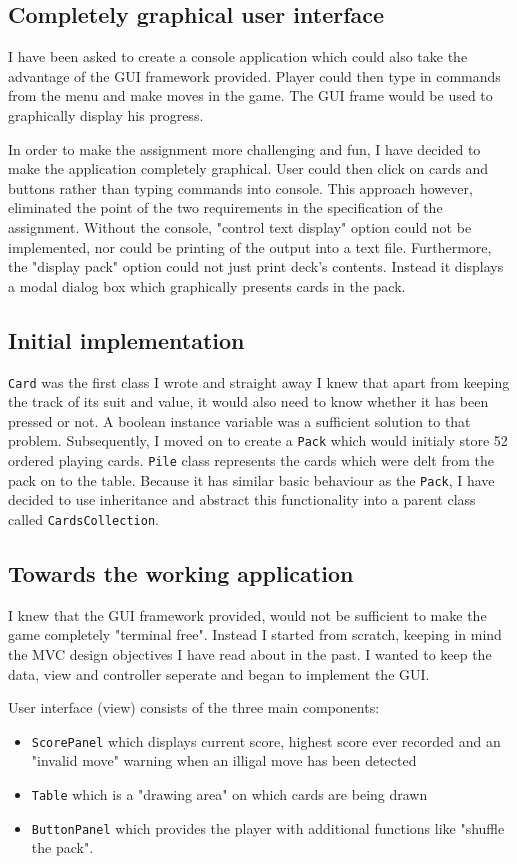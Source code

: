 \documentclass[a4paper, 11pt, titlepage]{article}
\begin{document}
\subsection{Completely graphical user interface}
I have been asked to create a console application which could also take the advantage of 
the GUI framework provided. Player could then type in commands from the menu and 
make moves in the game. The GUI frame would be used to graphically display his progress. 

In order to make the assignment more challenging and fun, I have decided to make the 
application completely graphical. User could then click on cards and buttons rather than
typing commands into console. This approach however, eliminated the point of the two 
requirements in the specification of the assignment. Without the console, "control text
display" option could not be implemented, nor could be printing of the output into a 
text file. Furthermore, the "display pack" option could not just print deck's contents.
Instead it displays a modal dialog box which graphically presents cards in the pack.

\subsection{Initial implementation}
\texttt{Card} was the first class I wrote and straight away I knew that apart from 
keeping the track of its suit and value, it would also need to know whether it has been
pressed or not. A boolean instance variable was a sufficient solution to that problem. 
Subsequently, I moved on to create a \texttt{Pack} which would initialy store 52 ordered
playing cards. \texttt{Pile} class represents the cards which were delt from the pack
on to the table. Because it has similar basic behaviour as the \texttt{Pack}, I have
decided to use inheritance and abstract this functionality into a parent class called
\texttt{CardsCollection}. 

\subsection{Towards the working application}
I knew that the GUI framework provided, would not be sufficient to make the game 
completely "terminal free". Instead I started from scratch, keeping in mind the MVC 
design objectives I have read about in the past. I wanted to keep the data, view and 
controller seperate and began to implement the GUI. 

User interface (view) consists of the three main components:
\begin{itemize}
	\item \texttt{ScorePanel} which displays current score, highest score ever recorded
		and an "invalid move" warning when an illigal move has been detected
	
	\item \texttt{Table} which is a "drawing area" on which cards are being drawn
	
	\item \texttt{ButtonPanel} which provides the player with additional functions like
		"shuffle the pack". 
\end{itemize}
\end{document}
